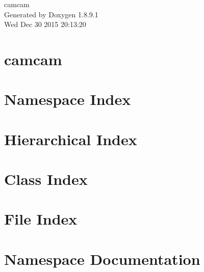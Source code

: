 \documentclass[twoside]{book}
\newcommand{\+}{\discretionary{\mbox{\scriptsize$\hookleftarrow$}}{}{}}
\newcommand{\clearemptydoublepage}{%
  \newpage{\pagestyle{empty}\cleardoublepage}%
}
\begin{document}
\hypersetup{pageanchor=false,
             bookmarks=true,
             bookmarksnumbered=true,
             pdfencoding=unicode
            }
\begin{titlepage}
\vspace*{7cm}
\begin{center}%
{\Large camcam }\\
\vspace*{1cm}
{\large Generated by Doxygen 1.8.9.1}\\
\vspace*{0.5cm}
{\small Wed Dec 30 2015 20:13:20}\\
\end{center}
\end{titlepage}
\clearemptydoublepage
\tableofcontents
\clearemptydoublepage
{}
\hypersetup{pageanchor=true}

\chapter{camcam}
\label{md__r_e_a_d_m_e}
\hypertarget{md__r_e_a_d_m_e}{}

\chapter{Namespace Index}

\chapter{Hierarchical Index}

\chapter{Class Index}

\chapter{File Index}

\chapter{Namespace Documentation}




















\end{document}
